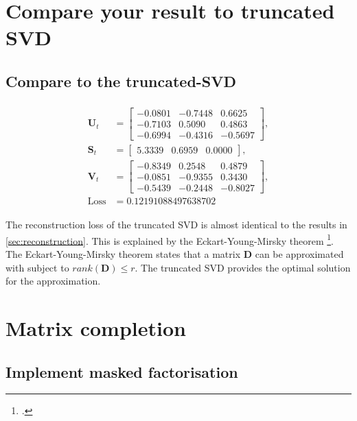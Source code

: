\documentclass[10pt, twocolumn]{article}
\begin{document}
\section{Compare your result to truncated SVD}

\subsection{Compare to the truncated-SVD}

\begin{align*}
    \begin{split}
    \pmb{U}_t &=
    \begin{bmatrix}
        -0.0801 & -0.7448 &  0.6625\\
        -0.7103 &  0.5090 &  0.4863\\
        -0.6994 & -0.4316 & -0.5697
    \end{bmatrix},\\
    \pmb{S}_t &=
    \begin{bmatrix}
        5.3339 & 0.6959 & 0.0000
    \end{bmatrix},\\
    \pmb{V}_t &=
    \begin{bmatrix}
        -0.8349 &  0.2548 &  0.4879\\
        -0.0851 & -0.9355 &  0.3430\\
        -0.5439 & -0.2448 & -0.8027
    \end{bmatrix},\\
    \text{Loss} &= 0.12191088497638702
    \end{split}
\end{align*}

The reconstruction loss of the truncated SVD is almost identical to the results in \cref{sec:reconstruction}. This is explained by the Eckart-Young-Mirsky theorem \footcite{eckart_approximation_1936}. The Eckart-Young-Mirsky theorem states that a matrix $\pmb{D}$ can be approximated with subject to $rank(\pmb{D}) \leq r$. The truncated SVD provides the optimal solution for the approximation.

\section{Matrix completion}

\subsection{Implement masked factorisation}
\end{document}
